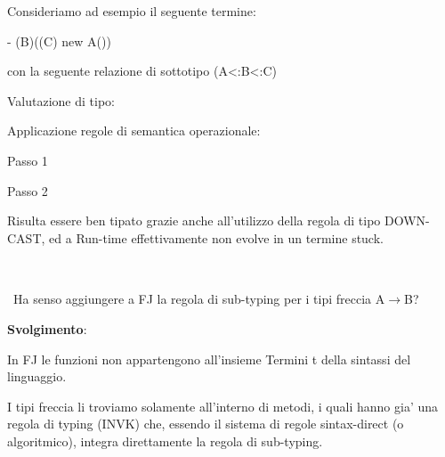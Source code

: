 \vspace{0,5cm}
Consideriamo ad esempio il seguente termine: 

	- (B)((C) new A())
	
	con la seguente relazione di sottotipo (A<:B<:C)

\vspace{0,5cm}	
Valutazione di tipo:

\vspace{0,3cm}
\begin{prooftree}
	\end{prooftree}
	
\vspace{1cm}	
Applicazione regole di semantica operazionale:

\vspace{0,3cm}
Passo 1
\begin{prooftree}
	\end{prooftree}	

\vspace{0,3cm}
Passo 2

	\begin{prooftree}
	\end{prooftree}	

\vspace{0,5cm}
Risulta essere ben tipato grazie anche all'utilizzo della regola di tipo DOWN-CAST, ed a Run-time effettivamente non evolve in un termine stuck.




\vspace{1cm}			 
\subsection*{}\
\\
\
Ha senso aggiungere a FJ la regola di sub-typing per i tipi freccia A$\rightarrow$B?


\vspace{0,5cm}
\noindent
\textbf{Svolgimento}:

\vspace{0,3cm}
In FJ le funzioni non appartengono all'insieme Termini t della sintassi del linguaggio.

I tipi freccia li troviamo solamente all'interno di metodi, i quali hanno gia' una regola di typing (INVK) che, essendo il sistema di  regole sintax-direct (o algoritmico), integra direttamente la regola di sub-typing.
 